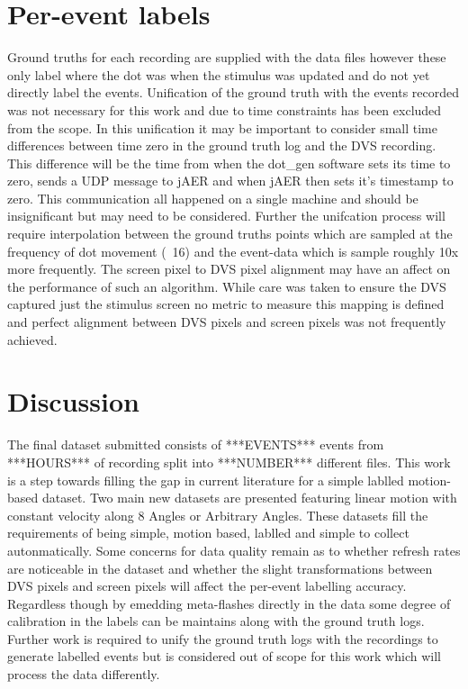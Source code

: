 \section{Per-event labels}
Ground truths for each recording are supplied with the data files however these only label where the dot was when the stimulus was updated and do not yet directly label the events.
Unification of the ground truth with the events recorded was not necessary for this work and due to time constraints has been excluded from the scope.
In this unification it may be important to consider small time differences between time zero in the ground truth log and the DVS recording.
This difference will be the time from when the dot\_gen software sets its time to zero, sends a UDP message to jAER and when jAER then sets it's timestamp to zero. 
This communication all happened on a single machine and should be insignificant but may need to be considered. 
Further the unifcation process will require interpolation between the ground truths points which are sampled at the frequency of dot movement (~16\ms) and the event-data which is sample roughly 10x more frequently.
The screen pixel to DVS pixel alignment may have an affect on the performance of such an algorithm. 
While care was taken to ensure the DVS captured just the stimulus screen no metric to measure this mapping is defined and perfect alignment between DVS pixels and screen pixels was not frequently achieved. 




\section{Discussion}
The final dataset submitted consists of ***EVENTS*** events from ***HOURS*** of recording split into ***NUMBER*** different files.
This work is a step towards filling the gap in current literature for a simple lablled motion-based dataset. 
Two main new datasets are presented featuring linear motion with constant velocity along 8 Angles or Arbitrary Angles.
These datasets fill the requirements of being simple, motion based, lablled and simple to collect autonmatically.
Some concerns for data quality remain as to whether refresh rates are noticeable in the dataset and whether the slight transformations between DVS pixels and screen pixels will affect the per-event labelling accuracy.
Regardless though by emedding meta-flashes directly in the data some degree of calibration in the labels can be maintains along with the ground truth logs. 
Further work is required to unify the ground truth logs with the recordings to generate labelled events but is considered out of scope for this work which will process the data differently. 

